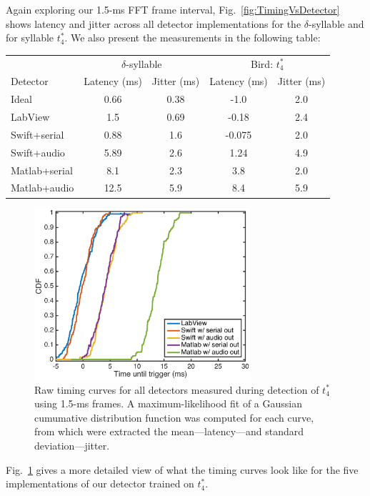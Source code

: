 \documentclass[10pt,letterpaper]{article}
\newcommand\fig[1]{Fig.~\ref{#1}}
\begin{document}
Again exploring our 1.5-ms FFT frame interval, \fig{fig:TimingVsDetector} shows latency and jitter across all detector implementations for the $\delta$-syllable and for syllable $t^*_4$.  We also present the measurements in the following table:

\vspace{8pt}
\begin{tabular}{l|c|c|c| c}
  & \multicolumn{2}{c}{$\delta$-syllable} & \multicolumn{2}{c}{Bird: $t^*_4$} \\
  Detector & Latency (ms) & Jitter (ms) & Latency (ms) & Jitter (ms) \\
  \hline
  Ideal & 0.66 & 0.38 & -1.0 & 2.0 \\
  LabView & 1.5 & 0.69 & -0.18 & 2.4 \\
  Swift+serial & 0.88 & 1.6 & -0.075 & 2.0 \\
  Swift+audio & 5.89 & 2.6 & 1.24 & 4.9 \\
  Matlab+serial & 8.1 & 2.3 & 3.8 & 2.0 \\
  Matlab+audio & 12.5 & 5.9 & 8.4 & 5.9
\end{tabular}

\vspace{8pt}

\begin{figure}
  \begin{center}
    \includegraphics[width=8cm]{timing}
  \end{center}
  \caption{Raw timing curves for all detectors measured during detection of $t^*_4$ using 1.5-ms frames.  A maximum-likelihood fit of a Gaussian cumumative distribution function was computed for each curve, from which were extracted the mean---latency---and standard deviation---jitter.}
  \label{fig:timing}
\end{figure}

\fig{fig:timing} gives a more detailed view of what the timing curves look like for the five implementations of our detector trained on $t^*_4$.
\end{document}
